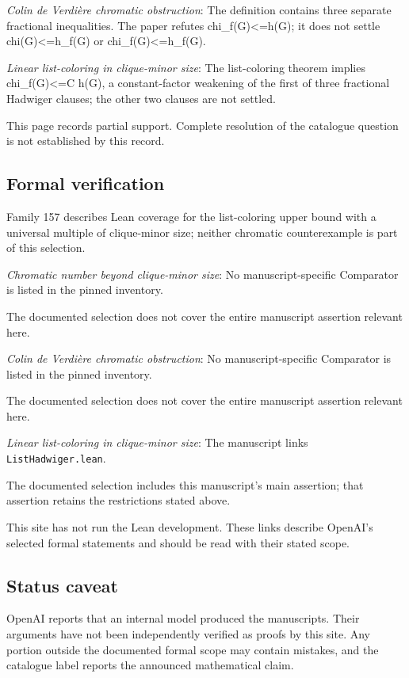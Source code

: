 \documentclass[11pt]{article}
\begin{document}
\textit{Colin de Verdière chromatic obstruction}: The definition contains three separate fractional inequalities. The paper refutes chi\_f(G)<=h(G); it does not settle chi(G)<=h\_f(G) or chi\_f(G)<=h\_f(G).

\textit{Linear list-coloring in clique-minor size}: The list-coloring theorem implies chi\_f(G)<=C h(G), a constant-factor weakening of the first of three fractional Hadwiger clauses; the other two clauses are not settled.

This page records partial support. Complete resolution of the catalogue question is not established by this record.

\subsection{Formal verification}
Family 157 describes Lean coverage for the list-coloring upper bound with a universal multiple of clique-minor size; neither chromatic counterexample is part of this selection.

\textit{Chromatic number beyond clique-minor size}: No manuscript-specific Comparator is listed in the pinned inventory.

The documented selection does not cover the entire manuscript assertion relevant here.

\textit{Colin de Verdière chromatic obstruction}: No manuscript-specific Comparator is listed in the pinned inventory.

The documented selection does not cover the entire manuscript assertion relevant here.

\textit{Linear list-coloring in clique-minor size}: The manuscript links \texttt{ListHadwiger.lean}.

The documented selection includes this manuscript’s main assertion; that assertion retains the restrictions stated above.

This site has not run the Lean development. These links describe OpenAI’s selected formal statements and should be read with their stated scope.

\subsection{Status caveat}
OpenAI reports that an internal model produced the manuscripts. Their arguments have not been independently verified as proofs by this site. Any portion outside the documented formal scope may contain mistakes, and the catalogue label reports the announced mathematical claim.
\end{document}
